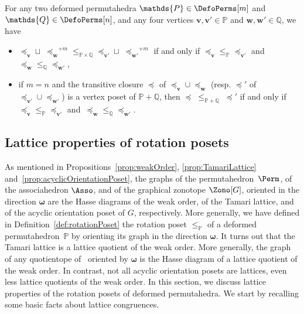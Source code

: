\documentclass[AHL,Unicode,longabstracts,published]{cedram}
\renewcommand{\b}[1]{\boldsymbol{#1}}
\newcommand{\polytope}[1]{\mathds{#1}}
\begin{document}
\begin{prop}\label{prop:CartesianProductMinkowskiSumRotationPosets}
For any two deformed permutahedra $\polytope{P} \in \DefoPerms[m]$ and \linebreak $\polytope{Q} \in \DefoPerms[n]$, and any four vertices ${\b{v}, \b{v}' \in \polytope{P}}$ and $\b{w}, \b{w}' \in \polytope{Q}$, we have
\begin{itemize}
\item ${\preccurlyeq_{\b{v}} \sqcup \; {\preccurlyeq_{\b{w}}}^{+m}} \le_{\polytope{P} \times \polytope{Q}} {\preccurlyeq_{\b{v}'} \sqcup \; {\preccurlyeq_{\b{w}'}}^{+m}}$ if and only if ${\preccurlyeq_{\b{v}}} \le_\polytope{P} {\preccurlyeq_{\b{v}'}}$ and ${\preccurlyeq_{\b{w}}} \le_\polytope{Q} {\preccurlyeq_{\b{w}'}}$,
\item if $m = n$ and the transitive closure $\preccurlyeq$ of $\preccurlyeq_{\b{v}} \cup \preccurlyeq_{\b{w}}$ (resp. $\preccurlyeq'$ of $\preccurlyeq_{\b{v}'} \cup \preccurlyeq_{\b{w}'}$) is a vertex poset of $\polytope{P} + \polytope{Q}$, then ${\preccurlyeq} \; \le_{\polytope{P} + \polytope{Q}} \; {\preccurlyeq}'$ if and only if ${\preccurlyeq_{\b{v}}} \le_\polytope{P} {\preccurlyeq_{\b{v}'}}$ and~${\preccurlyeq_{\b{w}}} \le_\polytope{Q} {\preccurlyeq_{\b{w}'}}$.
\end{itemize}
\end{prop}



\subsection{Lattice properties of rotation posets}\label{subsec:latticeProperties}

As mentioned in Propositions~\ref{prop:weakOrder}, \ref{prop:TamariLattice} and~\ref{prop:acyclicOrientationPoset}, the graphs of the permutahedron~$\Perm$, of the associahedron $\Asso$, and of the graphical zonotope $\Zono[G]$, oriented in the direction $\b{\omega}$ are the Hasse diagrams of the weak order, of the Tamari lattice, and of the acyclic orientation poset of $G$, respectively. More generally, we have defined in Definition~\ref{def:rotationPoset} the rotation poset $\le_\polytope{P}$ of a deformed permutahedron~$\polytope{P}$ by orienting its graph in the direction $\b{\omega}$. It turns out that the Tamari lattice is a lattice quotient of the weak order. More generally, the graph of any quotientope of~\cite{PilaudSantos-quotientopes} oriented by $\b{\omega}$ is the Hasse diagram of a lattice quotient of the weak order. In contrast, not all acyclic orientation posets are lattices, even less lattice quotients of the weak order. In this section, we discuss lattice properties of the rotation posets of deformed permutahedra. We start by recalling some basic facts about lattice congruences.
\end{document}
